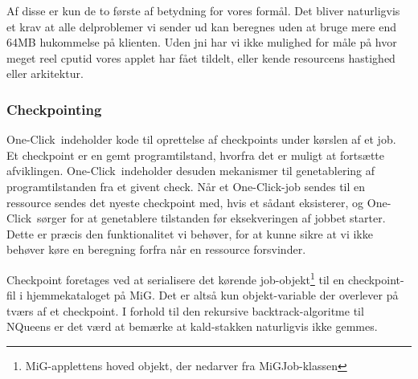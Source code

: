 \documentclass[draft,a4paper,10pt]{article}
\newcommand{\mig}{MiG}
\newcommand{\oc}{One-Click}
\begin{document}
Af disse er kun de to første af betydning for vores formål. Det bliver naturligvis et krav at alle delproblemer vi sender ud kan beregnes uden at bruge mere end 64MB hukommelse på klienten. Uden jni har vi ikke mulighed for måle på hvor meget reel cputid vores applet har fået tildelt, eller kende resourcens hastighed eller arkitektur. 
\subsubsection{Checkpointing}
\oc\ indeholder kode til oprettelse af checkpoints under kørslen af et job. Et checkpoint er en gemt programtilstand, hvorfra det er muligt at fortsætte afviklingen. \oc\ indeholder desuden mekanismer til genetablering af programtilstanden fra et givent check. Når et \oc-job sendes til en ressource sendes det nyeste checkpoint med, hvis et sådant eksisterer, og \oc\ sørger for at genetablere tilstanden før eksekveringen af jobbet starter. Dette er præcis den funktionalitet vi behøver, for at kunne sikre at vi ikke behøver køre en beregning forfra når en ressource forsvinder.    

Checkpoint foretages ved at serialisere det kørende job-objekt\footnote{\mig-applettens hoved objekt, der nedarver fra MiGJob-klassen} til en checkpoint-fil i hjemmekataloget på \mig. Det er altså kun objekt-variable der overlever på tværs af et checkpoint. I forhold til den rekursive backtrack-algoritme til NQueens er det værd at bemærke at kald-stakken naturligvis ikke gemmes.
\end{document}
